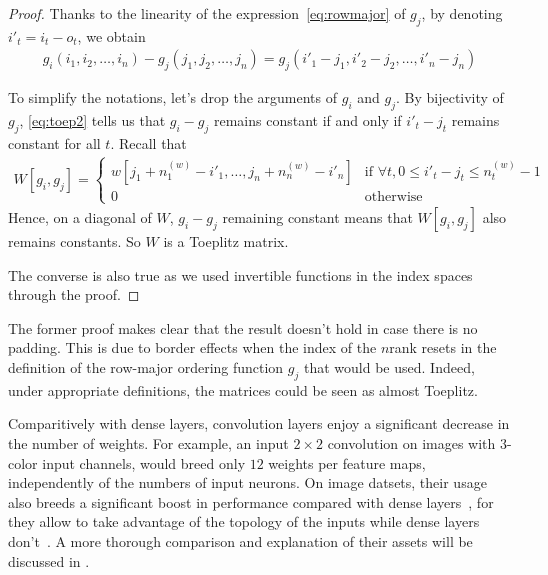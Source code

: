 \begin{proof}
Thanks to the linearity of the expression~\eqref{eq:rowmajor} of $g_j$, by denoting $i'_t = i_t - o_t$, we obtain
\begin{gather}
  g_i(i_1, i_2, \ldots, i_n) - g_j(j_1, j_2, \ldots, j_n) = g_j(i'_1 - j_1, i'_2 - j_2, \ldots, i'_n - j_n)
\label{eq:toep2}
\end{gather}

To simplify the notations, let's drop the arguments of $g_i$ and $g_j$. By bijectivity of $g_j$, \eqref{eq:toep2} tells us that $g_i - g_j$ remains constant if and only if $i'_t - j_t$ remains constant for all $t$. Recall that 
\begin{gather}
  W[g_i,g_j] =
 \begin{cases}
   w[j_1 + n_1^{(w)} - i'_1, \ldots, j_n + n_n^{(w)} - i'_n] & \text{if } \forall t, 0 \le i'_t - j_t \le n_t^{(w)} - 1 \\
   0 & \text{otherwise}
 \end{cases}
\label{eq:toep3}
\end{gather}
Hence, on a diagonal of $W$, $g_i - g_j$ remaining constant means that $W[g_i,g_j]$ also remains constants. So $W$ is a Toeplitz matrix.

The converse is also true as we used invertible functions in the index spaces through the proof.
\end{proof}

\begin{remark}
The former proof makes clear that the result doesn't hold in case there is no padding. This is due to border effects when the index of the $n$\powth rank resets in the definition of the row-major ordering function $g_j$ that would be used. Indeed, under appropriate definitions, the matrices could be seen as almost Toeplitz.
\end{remark}

\begin{remark}
Comparitively with dense layers, convolution layers enjoy a significant decrease in the number of weights. For example, an input $2 \times 2$ convolution on images with $3$-color input channels, would breed only $12$ weights per feature maps, independently of the numbers of input neurons. On image datsets, their usage also breeds a significant boost in performance compared with dense layers~\citep{krizhevsky2012imagenet}, for they allow to take advantage of the topology of the inputs while dense layers don't~\citep{lecun1995convolutional}. A more thorough comparison and explanation of their assets will be discussed in .
\end{remark}

